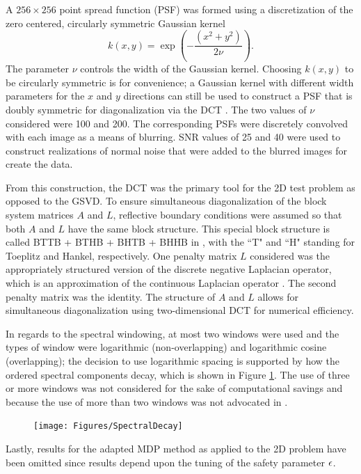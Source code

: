 \documentclass[12pt]{article}
\begin{document}
A $256 \times 256$ point spread function (PSF) was formed using a discretization of the zero centered, circularly symmetric Gaussian kernel
\[k(x,y) = \exp\left(-\frac{(x^2 + y^2)}{2\nu}\right).\]
The parameter $\nu$ controls the width of the Gaussian kernel. Choosing $k(x,y)$ to be circularly symmetric is for convenience; a Gaussian kernel with different width parameters for the $x$ and $y$ directions can still be used to construct a PSF that is doubly symmetric for diagonalization via the DCT \cite{HansenNagyOLeary}. The two values of $\nu$ considered were 100 and 200. The corresponding PSFs were discretely convolved with each image as a means of blurring. SNR values of 25 and 40 were used to construct realizations of normal noise that were added to the blurred images for create the data. \par 
From this construction, the DCT was the primary tool for the 2D test problem as opposed to the GSVD. To ensure simultaneous diagonalization of the block system matrices $A$ and $L$, reflective boundary conditions were assumed so that both $A$ and $L$ have the same block structure. This special block structure is called BTTB + BTHB + BHTB + BHHB in \cite{HansenNagyOLeary}, with the ``T" and ``H" standing for Toeplitz and Hankel, respectively. One penalty matrix $L$ considered was the appropriately structured version of the discrete negative Laplacian operator, which is an approximation of the continuous Laplacian operator \cite{DebnathMikusinski2005,LeVeque2007}. The second penalty matrix was the identity. The structure of $A$ and $L$ allows for simultaneous diagonalization using two-dimensional DCT for numerical efficiency. \par
In regards to the spectral windowing, at most two windows were used and the types of window were logarithmic (non-overlapping) and logarithmic cosine (overlapping); the decision to use logarithmic spacing is supported by how the ordered spectral components decay, which is shown in Figure \ref{fig:Spectral Decay}. The use of three or more windows was not considered for the sake of computational savings and because the use of more than two windows was not advocated in \cite{ChungEasleyOLeary}.

\begin{figure}[ht]
\texttt{[image: Figures/SpectralDecay]}
\caption{}
\label{fig:Spectral Decay}
\end{figure}

Lastly, results for the adapted MDP method as applied to the 2D problem have been omitted since results depend upon the tuning of the safety parameter $\epsilon$. 
\end{document}
